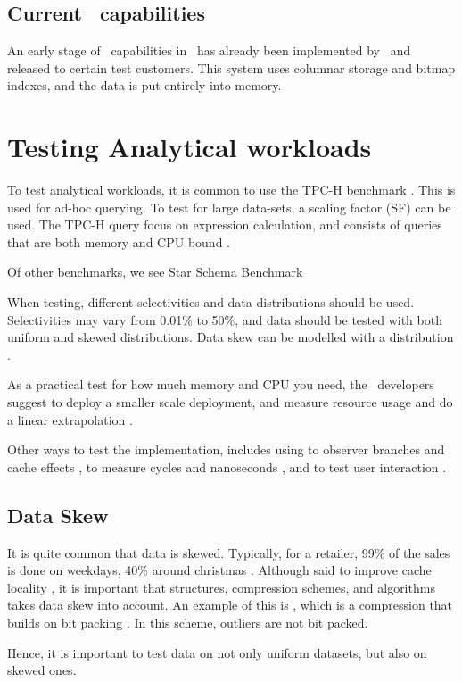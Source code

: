 \subsection{Current \bd~capabilities}
\label{sub:Current Business Discovery Capabilities}
An early stage of \bd~capabilities in \genusSoftware~has already been implemented by \genus~and released to certain test customers. This system uses columnar storage and bitmap indexes, and the data is put entirely into memory.



\section{Testing Analytical workloads}
\label{sec:Testing Analytical workloads}
To test analytical workloads, it is common to use the TPC-H benchmark \cite{Boncz2002-yj}. This is used for ad-hoc querying. To test for large data-sets, a scaling factor (SF) can be used. The TPC-H query focus on expression calculation, and consists of queries that are both memory and CPU bound \cite{Boncz2005-wj}.

Of other benchmarks, we see Star Schema Benchmark \cite{Boncz2002-yj}

When testing, different selectivities and data distributions should be used. Selectivities may vary from 0.01\% to 50\%, and data should be tested with both uniform and skewed distributions. Data skew can be modelled with a  distribution \cite{Holloway2008-rr}.

As a practical test for how much memory and CPU you need, the \qlikview~developers suggest to deploy a smaller scale deployment, and measure resource usage and do a linear extrapolation \cite{Qlik2011-yc}.

Other ways to test the implementation, includes using  to observer branches and cache effects \cite{Neumann2011-uq},  to measure cycles and nanoseconds \cite{Willhalm2013-ri}, and  to test user interaction \cite{Qlik2012-ku}.

\subsection{Data Skew}
\label{sub:Data Skew}
It is quite common that data is skewed. Typically, for a retailer, 99\% of the sales is done on weekdays, 40\% around christmas \cite{Raman2008-gi}. Although said to improve cache locality \cite{Larson2013-mc}, it is important that structures, compression schemes, and algorithms takes data skew into account. An example of this is , which is a compression that builds on bit packing \cite{Bjorklund2011-wh}. In this scheme, outliers are not bit packed.

Hence, it is important to test data on not only uniform datasets, but also on skewed ones.
